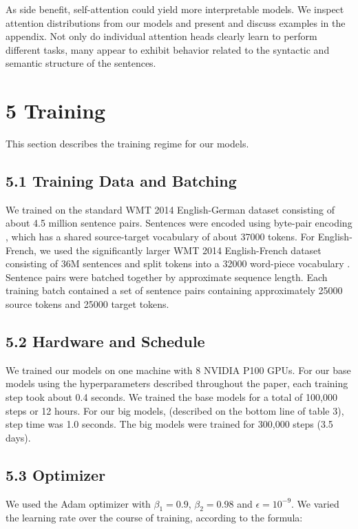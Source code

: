 \documentclass[conference]{IEEEtran}
\begin{document}
As side benefit, self-attention could yield more interpretable models. We inspect attention distributions from our models and present and discuss examples in the appendix. Not only do individual attention heads clearly learn to perform different tasks, many appear to exhibit behavior related to the syntactic and semantic structure of the sentences.

\section{5 Training}

This section describes the training regime for our models.

\subsection{5.1 Training Data and Batching}

We trained on the standard WMT 2014 English-German dataset consisting of about 4.5 million sentence pairs. Sentences were encoded using byte-pair encoding \cite{ref3}, which has a shared source-target vocabulary of about 37000 tokens. For English-French, we used the significantly larger WMT 2014 English-French dataset consisting of 36M sentences and split tokens into a 32000 word-piece vocabulary \cite{ref38}. Sentence pairs were batched together by approximate sequence length. Each training batch contained a set of sentence pairs containing approximately 25000 source tokens and 25000 target tokens.

\subsection{5.2 Hardware and Schedule}

We trained our models on one machine with 8 NVIDIA P100 GPUs. For our base models using the hyperparameters described throughout the paper, each training step took about 0.4 seconds. We trained the base models for a total of 100,000 steps or 12 hours. For our big models, (described on the bottom line of table 3), step time was 1.0 seconds. The big models were trained for 300,000 steps (3.5 days).

\subsection{5.3 Optimizer}

We used the Adam optimizer \cite{ref20} with $\beta_1 = 0.9$, $\beta_2 = 0.98$ and $\epsilon = 10^{-9}$. We varied the learning rate over the course of training, according to the formula:
\end{document}

